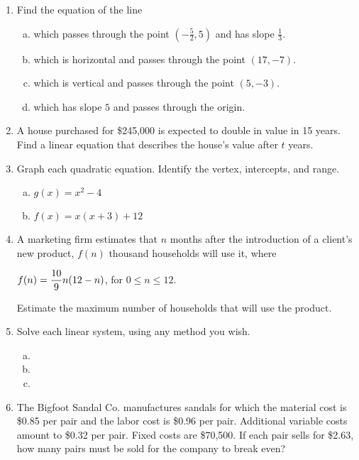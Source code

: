 \documentclass[11pt]{exam}
\begin{document}
\begin{enumerate}
\item Find the equation of the line
\begin{enumerate}[(a)]
\item which passes through the point $(-\frac{5}{2}, 5)$ and has slope $\frac{1}{3}$.
\item which is horizontal and passes through the point $(17,-7)$.
\item which is vertical and passes through the point $(5,-3)$.
\item which has slope $5$ and passes through the origin.
\end{enumerate}

\item A house purchased for \$245,000 is expected to double in value in 15 years.  Find a linear equation that describes the house's value after $t$ years.

\item Graph each quadratic equation.  Identify the vertex, intercepts, and range.
\begin{enumerate}[(a)]
\item $g(x) = x^2 - 4$
\item $f(x) = x(x+3) + 12$
\end{enumerate}

\item A marketing firm estimates that $n$ months after the introduction of a client's new product, $f(n)$ thousand households will use it, where
\begin{center}
$\displaystyle{f(n) = \frac{10}{9}n(12 - n)}$, for $0\leq n \leq 12$.
\end{center}
Estimate the maximum number of households that will use the product.

\item Solve each linear system, using any method you wish.
\begin{multicols}{2}
\begin{enumerate}[(a)]
\item {}
\item {}
\item {}
\end{enumerate}
\end{multicols}

\item The Bigfoot Sandal Co. manufactures sandals for which the material cost is \$0.85 per pair and the labor cost is \$0.96 per pair.  Additional variable costs amount to \$0.32 per pair.  Fixed costs are \$70,500.  If each pair sells for \$2.63, how many pairs must be sold for the company to break even?


\end{enumerate}
\end{document}
